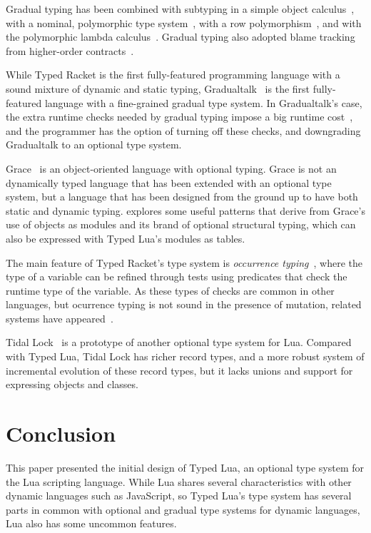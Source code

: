 \documentclass{sig-alternate}
\begin{document}
Gradual typing has been combined with subtyping in
a simple object calculus~\citet{siek2007objects}, with
a nominal, polymorphic type system~\citet{ina:gradual},
with a row polymorphism~\citet{tobin:gradual},
and with the polymorphic lambda calculus~\citet{ahmed2011bfa}.
Gradual typing also adopted blame tracking from
higher-order
contracts~\citet{siek2010blame,ahmed2001bfa,wadler2009wpc}.

While Typed Racket is the first fully-featured programming
language with a sound mixture of dynamic and static typing,
Gradualtalk~\citep{allende2013gts} is the first 
fully-featured language with a fine-grained gradual type
system. In Gradualtalk's case, the extra runtime checks
needed by gradual typing impose a big runtime
cost~\citep{allende2013cis}, and the programmer has the
option of turning off these checks, and downgrading
Gradualtalk to an optional type system.

Grace~\citet{black2013sg} is an object-oriented language
with optional typing. Grace is not an dynamically typed
language that has been extended with an optional type system,
but a language that has been designed from the ground up
to have both static and dynamic typing. \citet{homer2013modules}
explores some useful patterns that derive from Grace's
use of objects as modules and its brand of optional
structural typing, which can also be expressed with
Typed Lua's modules as tables.

The main feature of Typed Racket's type system is
{\em occurrence typing}~\citep{tobin:occur}, where
the type of a variable can be refined through tests
using predicates that check the runtime type of
the variable. As these types of checks are common in
other languages, but ocurrence typing is not sound
in the presence of mutation, related systems have
appeared~\citep{guha:flow,winther:flow,pearce:whiley}.

Tidal Lock~\citep{tidallock} is a prototype of another optional
type system for Lua. Compared with Typed Lua, Tidal Lock
has richer record types, and a more robust system of
incremental evolution of these record types, but it lacks
unions and support for expressing objects and classes.

\section{Conclusion}
\label{sec:con}

This paper presented the initial design of Typed Lua,
an optional type system for the Lua scripting language.
While Lua shares several characteristics with other
dynamic languages such as JavaScript, so Typed Lua's
type system has several parts in common with optional
and gradual type systems for dynamic languages,
Lua also has some uncommon features. 
\end{document}
